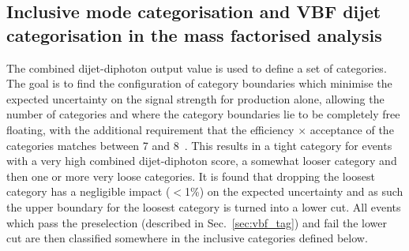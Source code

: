 
\subsection{Inclusive mode categorisation and VBF dijet categorisation in the mass factorised \MVA analysis}
\label{sec:inclusive_cats_massfac}

The combined dijet-diphoton \BDT output value is used to define a set of \VBF categories. The goal is to find the configuration of category boundaries which minimise the expected uncertainty on the signal strength for \VBF production alone, allowing the number of categories and where the category boundaries lie to be completely free floating, with the additional requirement that the efficiency $\times$ acceptance of the categories matches between 7 and 8~\TeV. This results in a tight \VBF category for events with a very high combined dijet-diphoton \BDT score, a somewhat looser category and then one or more very loose categories. It is found that dropping the loosest category has a negligible impact ($<$1\%) on the expected uncertainty and as such the upper boundary for the loosest category is turned into a lower cut. All events which pass the \VBF preselection (described in Sec.~\ref{sec:vbf_tag}) and fail the lower cut are then classified somewhere in the inclusive categories defined below. 

